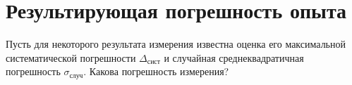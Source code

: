 

\section{Результирующая погрешность опыта}

Пусть для некоторого результата измерения известна оценка его максимальной
систематической погрешности $\Delta_{\text{сист}}$ и случайная
среднеквадратичная
погрешность $\sigma_{\text{случ}}$. Какова 
погрешность измерения?

